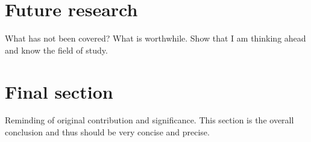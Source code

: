 \section{Future research}
What has not been covered? What is worthwhile.
Show that I am thinking ahead and know the field of study.

\section{Final section}
Reminding of original contribution and significance.
This section is the overall conclusion and thus should be very concise and precise.

